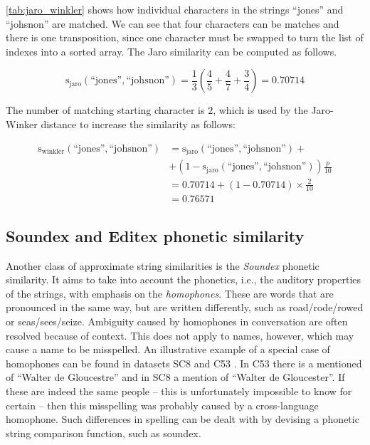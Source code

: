 \cref{tab:jaro_winkler} shows how individual characters in the strings ``jones'' and ``johsnon'' are matched.
We can see that four characters can be matches and there is one transposition, since one character must be swapped to turn the list of indexes into a sorted array.
The Jaro similarity can be computed as follows.

\begin{equation*}
    \mathrm{s_{jaro}}(\text{``jones''}, \text{``johsnon''}) = \frac{1}{3} \left(\frac{4}{5} + \frac{4}{7} + \frac{3}{4} \right) = 0.70714
\end{equation*}

\noindent The number of matching starting character is $2$, which is used by the Jaro-Winker distance to increase the similarity as follows:

\begin{align*}
    \mathrm{s_{winkler}}(\text{``jones''}, \text{``johsnon''}) &= \mathrm{s_{jaro}}(\text{``jones''}, \text{``johsnon''}) + \\
    &+(1-\mathrm{s_{jaro}}(\text{``jones''}, \text{``johsnon''}))\frac{p}{10} \\
    &= 0.70714 + (1 - 0.70714)\times\frac{2}{10} \\
    &= 0.76571
\end{align*}




\subsection{Soundex and Editex phonetic similarity}
\label{subsec:soundex}

Another class of approximate string similarities is the \emph{Soundex} phonetic similarity.
It aims to take into account the phonetics, i.e., the auditory properties of the strings, with emphasis on the \emph{homophones}.
These are words that are pronounced in the same way, but are written differently, such as road/rode/rowed or seas/sees/seize.
Ambiguity caused by homophones in conversation are often resolved because of context.
This does not apply to names, however, which may cause a name to be misspelled.
An illustrative example of a special case of homophones can be found in datasets SC8 \citep{SC8} and C53 \citep{C53}.
In C53 there is a mentioned of ``Walter de Gloucestre'' and in SC8 a mention of ``Walter de Gloucester''.
If these are indeed the same people -- this is unfortunately impossible to know for certain -- then this misspelling was probably caused by a cross-language homophone.
Such differences in spelling can be dealt with by devising a phonetic string comparison function, such as soundex.

